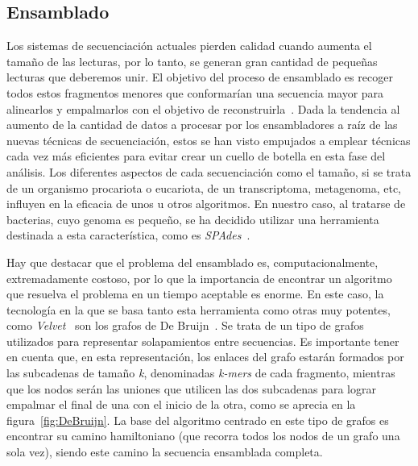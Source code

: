 \subsection{Ensamblado}
Los sistemas de secuenciación actuales pierden calidad cuando aumenta el tamaño de las lecturas, por lo tanto, se generan gran cantidad de pequeñas lecturas que deberemos unir. El objetivo del proceso de ensamblado es recoger todos estos fragmentos menores que conformarían una secuencia mayor para alinearlos y empalmarlos con el objetivo de reconstruirla~\cite{assembly_wiki}. Dada la tendencia al aumento de la cantidad de datos a procesar por los ensambladores a raíz de las nuevas técnicas de secuenciación, estos se han visto empujados a emplear técnicas cada vez más eficientes para evitar crear un cuello de botella en esta fase del análisis. Los diferentes aspectos de cada secuenciación como el tamaño, si se trata de un organismo procariota o eucariota, de un transcriptoma, metagenoma, etc, influyen en la eficacia de unos u otros algoritmos. En nuestro caso, al tratarse de bacterias, cuyo genoma es pequeño, se ha decidido utilizar una herramienta destinada a esta característica, como es \textit{SPAdes}~\cite{Nurk2013}. 

Hay que destacar que el problema del ensamblado es, computacionalmente, extremadamente costoso, por lo que la importancia de encontrar un algoritmo que resuelva el problema en un tiempo aceptable es enorme. En este caso, la tecnología en la que se basa tanto esta herramienta como otras muy potentes, como \textit{Velvet}~\cite{Zerbino2008} son los grafos de De Bruijn~\cite{Compeau2011}. Se trata de un tipo de grafos utilizados para representar solapamientos entre secuencias. Es importante tener en cuenta que, en esta representación, los enlaces del grafo estarán formados por las subcadenas de tamaño \textit{k}, denominadas \textit{k-mers} de cada fragmento, mientras que los nodos serán las uniones que utilicen las dos subcadenas para lograr empalmar el final de una con el inicio de la otra, como se aprecia en la figura~\ref{fig:DeBruijn}. La base del algoritmo centrado en este tipo de grafos es encontrar su camino hamiltoniano (que recorra todos los nodos de un grafo una sola vez), siendo este camino la secuencia ensamblada completa.

